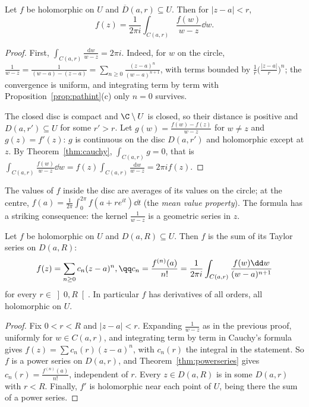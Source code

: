 \begin{theorem}\label{thm:cauchyformula}
Let $f$ be holomorphic on $U$ and $\overline D(a,r)\subseteq U$. Then for $|z-a|<r$,
\[
f(z)=\frac1{2\pi i}\int_{C(a,r)}\frac{f(w)}{w-z}\dd w.
\]
\end{theorem}
\begin{proof}
First, $\int_{C(a,r)}\frac{\mathrm dw}{w-z}=2\pi i$. Indeed, for $w$ on the circle, $\frac1{w-z}=\frac1{(w-a)-(z-a)}=\sum_{n\ge0}\frac{(z-a)^n}{(w-a)^{n+1}}$, with
terms bounded by $\frac1r\bigl(\frac{|z-a|}r\bigr)^n$; the convergence is uniform, and integrating term by term with Proposition~\ref{prop:pathint}(c)
only $n=0$ survives.

The closed disc is compact and $\C\setminus U$ is closed, so their distance is positive and $D(a,r')\subseteq U$ for some $r'>r$. Let
$g(w)=\frac{f(w)-f(z)}{w-z}$ for $w\ne z$ and $g(z)=f'(z)$: $g$ is continuous on the disc $D(a,r')$ and holomorphic except at $z$. By
Theorem~\ref{thm:cauchy}, $\int_{C(a,r)}g=0$, that is $\int_{C(a,r)}\frac{f(w)}{w-z}\dd w=f(z)\int_{C(a,r)}\frac{\mathrm dw}{w-z}=2\pi if(z)$.
\end{proof}

The values of $f$ inside the disc are averages of its values on the circle; at the centre, $f(a)=\frac1{2\pi}\int_0^{2\pi}f(a+re^{it})\dd t$
(the \emph{mean value property}). The formula has a striking consequence: the kernel $\frac1{w-z}$ is a geometric series in $z$.

\begin{theorem}\label{thm:analytic}
Let $f$ be holomorphic on $U$ and $D(a,R)\subseteq U$. Then $f$ is the sum of its Taylor series on $D(a,R)$:
\[
\begin{gathered}f(z)=\sum_{n\ge0}c_n(z-a)^n,\qq c_n=\frac{f^{(n)}(a)}{n!}=\frac1{2\pi i}\int_{C(a,r)}\frac{f(w)\dd w}{(w-a)^{n+1}}\end{gathered}
\]
for every $r\in\left]0,R\right[$.
In particular $f$ has derivatives of all orders, all holomorphic on $U$.
\end{theorem}
\begin{proof}
Fix $0<r<R$ and $|z-a|<r$. Expanding $\frac1{w-z}$ as in the previous proof, uniformly for $w\in C(a,r)$, and integrating term by term
in Cauchy's formula gives $f(z)=\sum c_n(r)(z-a)^n$, with $c_n(r)$ the integral in the statement. So $f$ is a power series on $D(a,r)$, and
Theorem~\ref{thm:powerseries} gives $c_n(r)=\frac{f^{(n)}(a)}{n!}$, independent of $r$. Every $z\in D(a,R)$ is in some $D(a,r)$ with $r<R$. Finally, $f'$ is
holomorphic near each point of $U$, being there the sum of a power series.
\end{proof}

